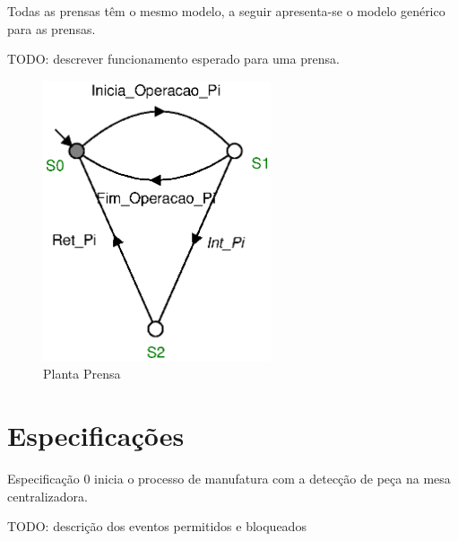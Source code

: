 Todas as prensas têm o mesmo modelo, a seguir apresenta-se o modelo genérico para as prensas.

TODO: descrever funcionamento esperado para uma prensa.

\begin{figure}[H]%
    \centering
    \includegraphics[width=0.6\textwidth]{imagens/Prensa.eps}
    \caption{Planta Prensa}\label{fig:prensa}
\end{figure}

\section{Especificações}
Especificação 0 inicia o processo de manufatura com a detecção de peça na mesa centralizadora.

TODO: descrição dos eventos permitidos e bloqueados

